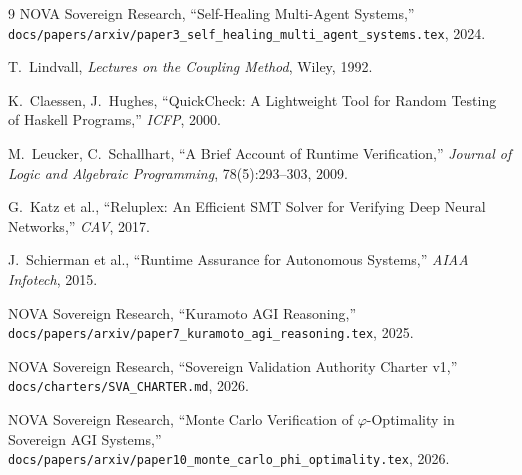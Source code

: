 \documentclass[11pt,a4paper]{article}
\begin{document}
\begin{thebibliography}{9}
  NOVA Sovereign Research,
  ``Self-Healing Multi-Agent Systems,''
  \texttt{docs/papers/arxiv/paper3\_self\_healing\_multi\_agent\_systems.tex}, 2024.

  T.\ Lindvall,
  \emph{Lectures on the Coupling Method},
  Wiley, 1992.

  K.\ Claessen, J.\ Hughes,
  ``QuickCheck: A Lightweight Tool for Random Testing of Haskell Programs,''
  \emph{ICFP}, 2000.

  M.\ Leucker, C.\ Schallhart,
  ``A Brief Account of Runtime Verification,''
  \emph{Journal of Logic and Algebraic Programming}, 78(5):293--303, 2009.

  G.\ Katz et al.,
  ``Reluplex: An Efficient SMT Solver for Verifying Deep Neural Networks,''
  \emph{CAV}, 2017.

  J.\ Schierman et al.,
  ``Runtime Assurance for Autonomous Systems,''
  \emph{AIAA Infotech}, 2015.

  NOVA Sovereign Research,
  ``Kuramoto AGI Reasoning,''
  \texttt{docs/papers/arxiv/paper7\_kuramoto\_agi\_reasoning.tex}, 2025.

  NOVA Sovereign Research,
  ``Sovereign Validation Authority Charter v1,''
  \texttt{docs/charters/SVA\_CHARTER.md}, 2026.

  NOVA Sovereign Research,
  ``Monte Carlo Verification of $\varphi$-Optimality in Sovereign AGI Systems,''
  \texttt{docs/papers/arxiv/paper10\_monte\_carlo\_phi\_optimality.tex}, 2026.
\end{thebibliography}
\end{document}
